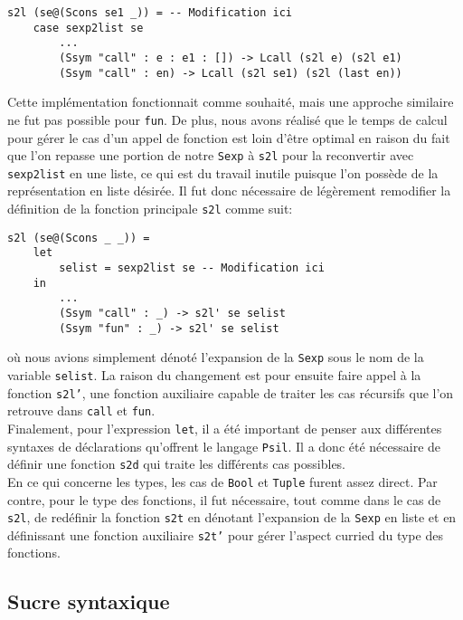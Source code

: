 \documentclass[10pt, titlepage]{article}
\begin{document}
\begin{lstlisting}
s2l (se@(Scons se1 _)) = -- Modification ici
    case sexp2list se
        ...
        (Ssym "call" : e : e1 : []) -> Lcall (s2l e) (s2l e1)
        (Ssym "call" : en) -> Lcall (s2l se1) (s2l (last en))
\end{lstlisting}

Cette implémentation fonctionnait comme souhaité, mais une approche similaire
ne fut pas possible pour \texttt{fun}. De plus, nous avons réalisé que le temps
de calcul pour gérer le cas d'un appel de fonction est loin d'être optimal en
raison du fait que l'on repasse une portion de notre \texttt{Sexp} à
\texttt{s2l} pour la reconvertir avec \texttt{sexp2list} en une liste, ce qui
est du travail inutile puisque l'on possède de la représentation en liste
désirée. Il fut donc nécessaire de légèrement remodifier la définition de la
fonction principale \texttt{s2l} comme suit:
\begin{lstlisting}
s2l (se@(Scons _ _)) =
    let
        selist = sexp2list se -- Modification ici
    in
        ...
        (Ssym "call" : _) -> s2l' se selist
        (Ssym "fun" : _) -> s2l' se selist
\end{lstlisting}

où nous avions simplement dénoté l'expansion de la \texttt{Sexp} sous le nom de
la variable \texttt{selist}. La raison du changement est pour ensuite faire
appel à la fonction \texttt{s2l'}, une fonction auxiliaire capable de traiter
les cas récursifs que l'on retrouve dans \texttt{call} et \texttt{fun}. \\
Finalement, pour l'expression \texttt{let}, il a été important de penser aux
différentes syntaxes de déclarations qu'offrent le langage \texttt{Psil}. Il a
donc été nécessaire de définir une fonction \texttt{s2d} qui traite les
différents cas possibles. \\

En ce qui concerne les types, les cas de \texttt{Bool} et \texttt{Tuple} furent
assez direct. Par contre, pour le type des fonctions, il fut nécessaire, tout
comme dans le cas de \texttt{s2l}, de redéfinir la fonction \texttt{s2t} en
dénotant l'expansion de la \texttt{Sexp} en liste et en définissant une
fonction auxiliaire \texttt{s2t'} pour gérer l'aspect curried du type des
fonctions.

\subsection{Sucre syntaxique}
\end{document}
